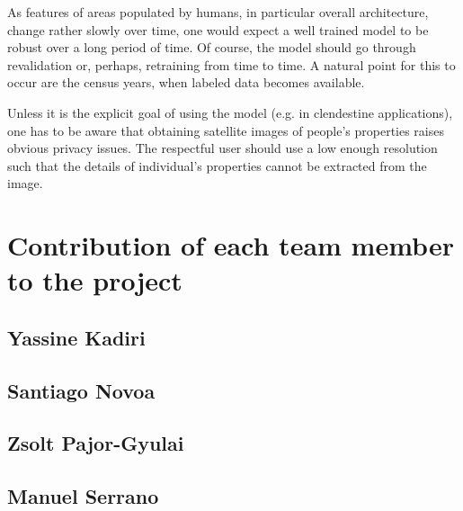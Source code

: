 \documentclass{article}
\begin{document}
As features of areas populated by humans, in particular overall architecture, change rather slowly over time, one would expect a well trained model to be robust over a long period of time. Of course, the model should go through revalidation or, perhaps, retraining from time to time. A natural point for this to occur are the census years, when labeled data becomes available.

Unless it is the explicit goal of using the model (e.g. in clendestine applications), one has to be aware that obtaining satellite images of people's properties raises obvious privacy issues. The respectful user should use a low enough resolution such that the details of individual's properties cannot be extracted from the image.

\appendix
\section{Contribution of each team member to the project}
\subsection{Yassine Kadiri}
\subsection{Santiago Novoa}
\subsection{Zsolt Pajor-Gyulai}
\subsection{Manuel Serrano}
\end{document}
